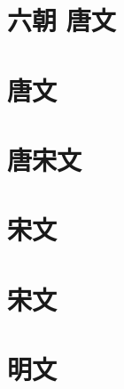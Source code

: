 \documentclass[openany,a5paper]{utbook}
\begin{document}
\chapter[{\small 六朝 唐文}]{六朝 唐文}


\chapter[{\small 唐文}]{唐文}


\chapter[{\small 唐宋文}]{唐宋文}


\chapter[{\small 宋文}]{宋文}


\chapter[{\small 宋文}]{宋文}


\chapter[{\small 明文}]{明文}

\end{document}
